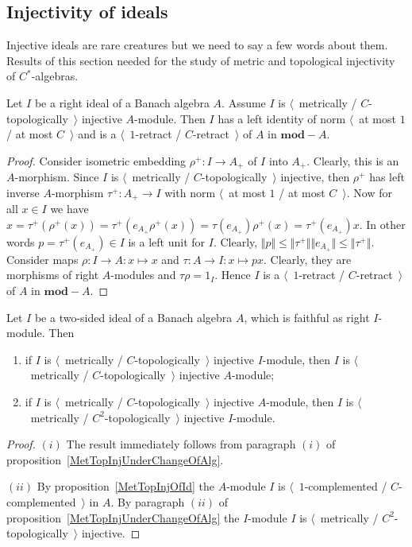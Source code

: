\subsection{
    Injectivity of ideals
}\label{SubSectionInjectivityOfIdeals}

Injective ideals are rare creatures but we need to say a few words about them.
Results of this section needed for the study of metric and topological
injectivity of $C^*$-algebras.

\begin{proposition}\label{MetTopInjOfId} Let $I$ be a right ideal of a Banach
algebra $A$. Assume $I$ is $\langle$~metrically / $C$-topologically~$\rangle$
injective $A$-module. Then $I$ has a left identity of norm $\langle$~at most $1$
/ at most $C$~$\rangle$ and is a $\langle$~$1$-retract / $C$-retract~$\rangle$
of $A$ in $\mathbf{mod}-A$.
\end{proposition}
\begin{proof} Consider isometric embedding $\rho^+:I\to A_+$ of $I$ into $A_+$.
Clearly, this is an $A$-morphism. Since $I$ is $\langle$~metrically /
$C$-topologically~$\rangle$ injective, then $\rho^+$ has left inverse
$A$-morphism $\tau^+:A_+\to I$ with norm $\langle$~at most $1$ / at most
$C$~$\rangle$. Now for all $x\in I$ we have
$x
=\tau^+(\rho^+(x))
=\tau^+(e_{A_+}\rho^+(x))
=\tau(e_{A_+})\rho^+(x)=\tau^+(e_{A_+})x$.
In other words $p=\tau^+(e_{A_+})\in I$ is a left unit for $I$. Clearly, 
$\Vert p\Vert
\leq\Vert\tau^+\Vert\Vert e_{A_+}\Vert
\leq\Vert\tau^+\Vert$. Consider maps
$\rho:I\to A:x\mapsto x$ and $\tau:A\to I:x\mapsto p x$. Clearly, they are
morphisms of right $A$-modules and $\tau\rho=1_I$. Hence $I$ is a
$\langle$~$1$-retract / $C$-retract~$\rangle$ of $A$ in $\mathbf{mod}-A$.
\end{proof}

\begin{proposition}\label{ReduceInjIdToInjAlg} Let $I$ be a two-sided ideal of
a Banach algebra $A$, which is faithful as right $I$-module. Then

\begin{enumerate}[label = (\roman*)]
    \item if $I$ is $\langle$~metrically / $C$-topologically~$\rangle$ injective
    $I$-module, then $I$ is $\langle$~metrically / $C$-topologically~$\rangle$
    injective $A$-module; 

    \item if $I$ is $\langle$~metrically / $C$-topologically~$\rangle$ injective
    $A$-module, then $I$ is $\langle$~metrically / $C^2$-topologically~$\rangle$
    injective $I$-module.
\end{enumerate}
\end{proposition}
\begin{proof} $(i)$ The result immediately follows from paragraph $(i)$ of
proposition~\ref{MetTopInjUnderChangeOfAlg}.

$(ii)$ By proposition~\ref{MetTopInjOfId} the $A$-module $I$ is
$\langle$~$1$-complemented / $C$-complemented~$\rangle$ in $A$. By paragraph
$(ii)$ of proposition~\ref{MetTopInjUnderChangeOfAlg} the $I$-module $I$ is
$\langle$~metrically / $C^2$-topologically~$\rangle$ injective.
\end{proof}
